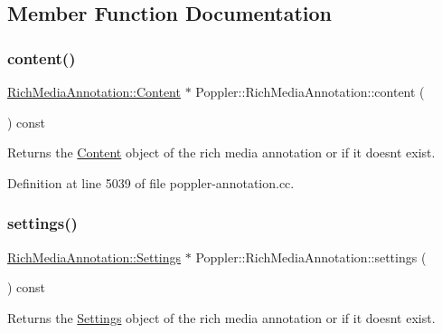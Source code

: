 \subsection{Member Function Documentation}
\mbox{\label{class_poppler_1_1_rich_media_annotation_af648b2e0f5c00ab7bc01d0bb1ae5681f}} 
\subsubsection{\texorpdfstring{content()}{content()}}
{\footnotesize\ttfamily \hyperlink{class_poppler_1_1_rich_media_annotation_1_1_content}{Rich\+Media\+Annotation\+::\+Content} $\ast$ Poppler\+::\+Rich\+Media\+Annotation\+::content (\begin{DoxyParamCaption}{ }\end{DoxyParamCaption}) const}

Returns the \hyperlink{class_poppler_1_1_rich_media_annotation_1_1_content}{Content} object of the rich media annotation or {} if it doesn\textquotesingle{}t exist. 

Definition at line 5039 of file poppler-\/annotation.\+cc.

\mbox{\label{class_poppler_1_1_rich_media_annotation_ad80e513295b78d1d38d89a360a624649}} 
\subsubsection{\texorpdfstring{settings()}{settings()}}
{\footnotesize\ttfamily \hyperlink{class_poppler_1_1_rich_media_annotation_1_1_settings}{Rich\+Media\+Annotation\+::\+Settings} $\ast$ Poppler\+::\+Rich\+Media\+Annotation\+::settings (\begin{DoxyParamCaption}{ }\end{DoxyParamCaption}) const}

Returns the \hyperlink{class_poppler_1_1_rich_media_annotation_1_1_settings}{Settings} object of the rich media annotation or {} if it doesn\textquotesingle{}t exist. 


